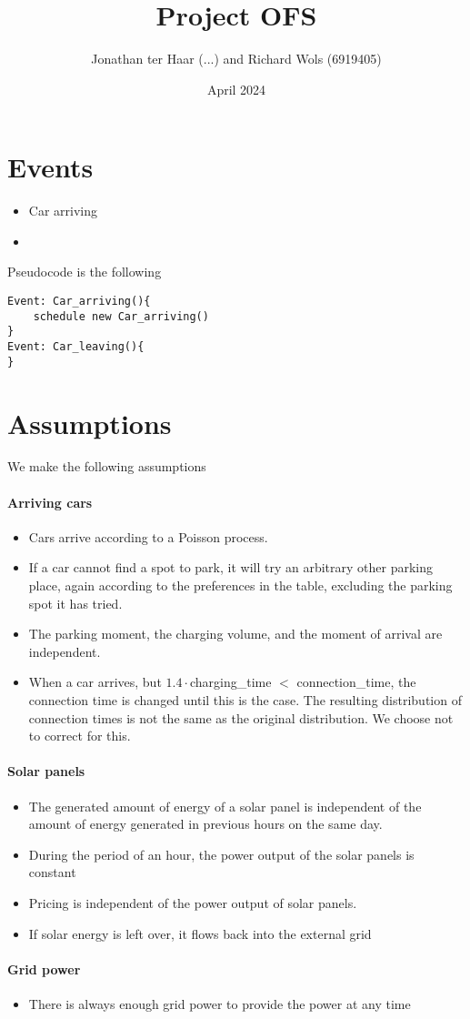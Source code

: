 \documentclass{article}
\title{Project OFS}
\author{Jonathan ter Haar (...) and Richard Wols (6919405)}
\date{April 2024}
\begin{document}
\maketitle

\section{Events}
\begin{itemize}
\item Car arriving
\item 
\end{itemize}

Pseudocode is the following
\begin{verbatim}
Event: Car_arriving(){
    schedule new Car_arriving()
}
Event: Car_leaving(){
}
\end{verbatim}

\section{Assumptions}
We make the following assumptions
\paragraph{Arriving cars}
\begin{itemize}
\item Cars arrive according to a Poisson process. 
\item If a car cannot find a spot to park, it will try an arbitrary other parking place, again according to the preferences in the table, excluding the parking spot it has tried.
\item The parking moment, the charging volume, and the moment of arrival are independent.
\item When a car arrives, but $1.4\cdot $charging\_time $<$  connection\_time, the connection time is changed until this is the case. The resulting distribution of connection times is not the same as the original distribution. We choose not to correct for this.
\end{itemize}
\paragraph{Solar panels}
\begin{itemize}
\item The generated amount of energy of a solar panel is independent of the amount of energy generated in previous hours on the same day.
\item During the period of an hour, the power output of the solar panels is constant
\item Pricing is independent of the power output of solar panels.
\item If solar energy is left over, it flows back into the external grid
\end{itemize}
\paragraph{Grid power}
\begin{itemize}
\item There is always enough grid power to provide the power at any time
\end{itemize}
\end{document}
